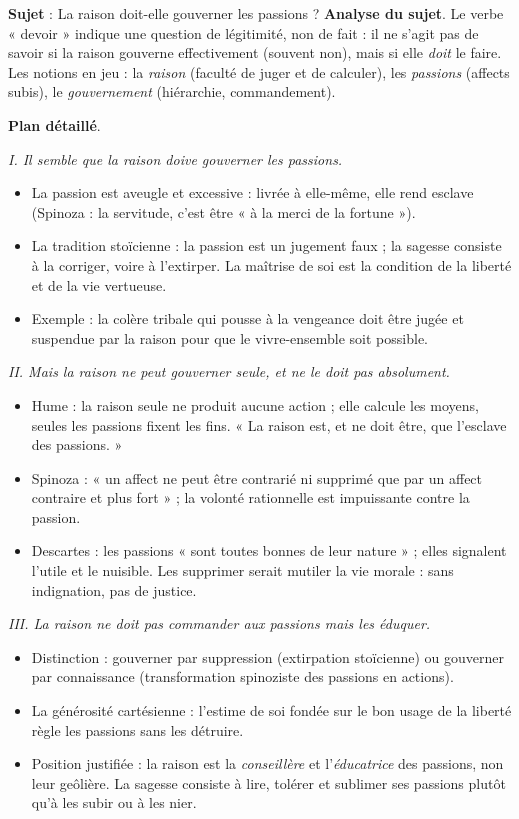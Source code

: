 \documentclass[11pt]{article}
\begin{document}
\begin{exoresolu}
\textbf{Sujet} : La raison doit-elle gouverner les passions ?
\tcblower
\textbf{Analyse du sujet}. Le verbe « devoir » indique une question de légitimité, non de fait : il ne s'agit pas de savoir si la raison gouverne effectivement (souvent non), mais si elle \emph{doit} le faire. Les notions en jeu : la \emph{raison} (faculté de juger et de calculer), les \emph{passions} (affects subis), le \emph{gouvernement} (hiérarchie, commandement).

\textbf{Plan détaillé}.

\emph{I. Il semble que la raison doive gouverner les passions.}
\begin{itemize}
\item La passion est aveugle et excessive : livrée à elle-même, elle rend esclave (Spinoza : la servitude, c'est être « à la merci de la fortune »).
\item La tradition stoïcienne : la passion est un jugement faux ; la sagesse consiste à la corriger, voire à l'extirper. La maîtrise de soi est la condition de la liberté et de la vie vertueuse.
\item Exemple : la colère tribale qui pousse à la vengeance doit être jugée et suspendue par la raison pour que le vivre-ensemble soit possible.
\end{itemize}

\emph{II. Mais la raison ne peut gouverner seule, et ne le doit pas absolument.}
\begin{itemize}
\item Hume : la raison seule ne produit aucune action ; elle calcule les moyens, seules les passions fixent les fins. « La raison est, et ne doit être, que l'esclave des passions. »
\item Spinoza : « un affect ne peut être contrarié ni supprimé que par un affect contraire et plus fort » ; la volonté rationnelle est impuissante contre la passion.
\item Descartes : les passions « sont toutes bonnes de leur nature » ; elles signalent l'utile et le nuisible. Les supprimer serait mutiler la vie morale : sans indignation, pas de justice.
\end{itemize}

\emph{III. La raison ne doit pas commander aux passions mais les éduquer.}
\begin{itemize}
\item Distinction : gouverner par suppression (extirpation stoïcienne) ou gouverner par connaissance (transformation spinoziste des passions en actions).
\item La générosité cartésienne : l'estime de soi fondée sur le bon usage de la liberté règle les passions sans les détruire.
\item Position justifiée : la raison est la \emph{conseillère} et l'\emph{éducatrice} des passions, non leur geôlière. La sagesse consiste à lire, tolérer et sublimer ses passions plutôt qu'à les subir ou à les nier.
\end{itemize}


\end{exoresolu}
\end{document}
